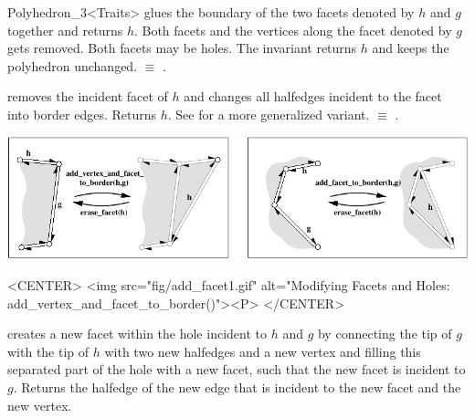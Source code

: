 \begin{ccRefClass}{Polyhedron_3<Traits>}
   {glues the boundary of the two facets denoted by $h$ and $g$ together
    and returns $h$. Both facets and the vertices along the facet denoted
    by $g$ gets removed. Both facets may be holes. The invariant
     returns $h$ and keeps the
    polyhedron unchanged.
      $\equiv$
    .}


    {removes the incident facet of $h$ and changes all halfedges incident
    to the facet into border edges. Returns $h$.
    See  for a more generalized variant.
      $\equiv$
    .}


\begin{ccTexOnly}
    \begin{center}
      \parbox{\textwidth}{%
          \includegraphics[width=\textwidth]{Polyhedron_ref/fig/add_facet}%
      }
    \end{center}
\end{ccTexOnly}

\begin{ccHtmlOnly}
    <CENTER>
    <img src="fig/add_facet1.gif"
     alt="Modifying Facets and Holes: add_vertex_and_facet_to_border()"><P>
    </CENTER>
\end{ccHtmlOnly}


   {creates a new facet within the hole incident to $h$
   and $g$ by connecting the tip of $g$ with the tip of $h$
   with two new halfedges and a new vertex and filling this separated
   part of the hole with a new facet, such that the new facet is
   incident to $g$. Returns the halfedge of the new edge that is
   incident to the new facet and the new vertex.
    }


\end{ccRefClass}
